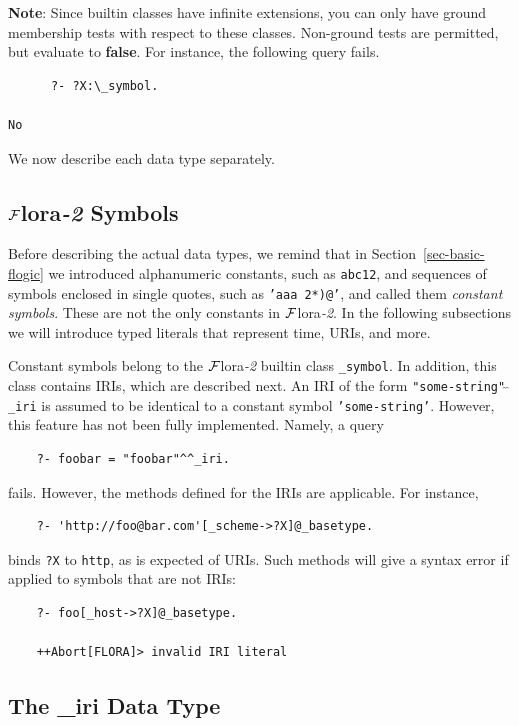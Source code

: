 \documentclass[11pt]{article}
\newcommand{\FLORA}{{\mbox{\sc ${\cal F}${lora}\rm\emph{-2}}}\xspace}
\begin{document}
{\bf Note}: Since builtin classes have infinite extensions, you can only have
ground membership tests with respect to these classes. Non-ground tests are
permitted, but evaluate to {\bf false}. For instance, the following
query fails.
\begin{verbatim}
      ?- ?X:\_symbol.
 
No
\end{verbatim}

We now describe each data type separately.

\subsection{\FLORA Symbols}

Before describing the actual data types, we remind that
in Section~\ref{sec-basic-flogic} we introduced
alphanumeric constants, such as {\tt abc12}, and sequences of symbols
enclosed in single quotes, such as {\tt 'aaa 2*)@'},  and called them
\emph{constant symbols}. These are not the only constants in \FLORA.
In the following subsections we will introduce typed literals that
represent time, URIs, and more. 

Constant symbols belong to the \FLORA builtin class {\tt \_symbol}.
In addition, this class contains IRIs, which are described next.
An IRI of the form {\tt "some-string"$\hat{~}\hat{~}$\_iri} is assumed to
be identical to
a constant symbol {\tt 'some-string'}. However, this feature has not been
fully implemented. Namely, a query
\begin{verbatim}
    ?- foobar = "foobar"^^_iri.
\end{verbatim}
fails. However, the methods defined for the IRIs are applicable. For
instance,
\begin{verbatim}
    ?- 'http://foo@bar.com'[_scheme->?X]@_basetype.
\end{verbatim}
binds {\tt ?X} to {\tt http}, as is expected of URIs.
Such methods will give a syntax error if applied to symbols that are not
IRIs:
\begin{verbatim}
    ?- foo[_host->?X]@_basetype.

    ++Abort[FLORA]> invalid IRI literal
\end{verbatim}


\subsection{The \_iri Data Type}\label{sec-uri}
\end{document}
